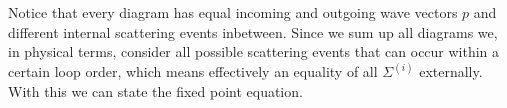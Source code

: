 Notice that every diagram has equal incoming and outgoing wave vectors $p$ and different internal scattering events inbetween. Since we sum up all diagrams we, in physical terms, consider all possible scattering events that can occur within a certain loop order, which means effectively an equality of all $\Sigma^{(i)}$ externally. With this we can state the fixed point equation. 
